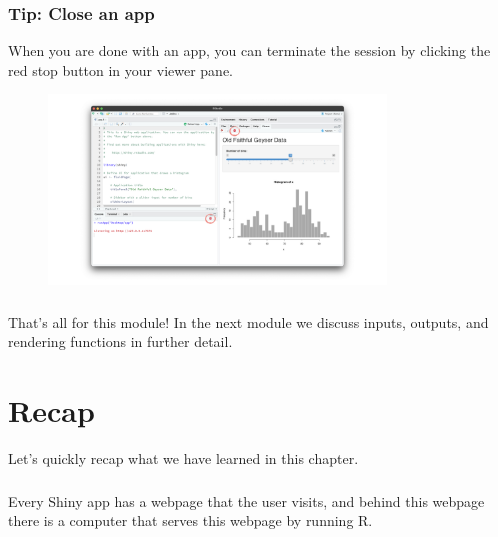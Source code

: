 \documentclass[
  letterpaper,
  DIV=11,
  numbers=noendperiod]{scrreprt}
\begin{document}
\hypertarget{tip-close-an-app-2}{%
\subsection{Tip: Close an app}\label{tip-close-an-app-2}}

When you are done with an app, you can terminate the session by clicking
the red stop button in your viewer pane.

\begin{figure}

{\centering \includegraphics[width=0.8\textwidth,height=\textheight]{./images/recap-6.png}

}

\end{figure}

\hypertarget{section-21}{%
\subsection{}\label{section-21}}

That's all for this module! In the next module we discuss inputs,
outputs, and rendering functions in further detail.

\hypertarget{recap-3}{%
\chapter{Recap}\label{recap-3}}

Let's quickly recap what we have learned in this chapter.

\hypertarget{section-22}{%
\subsection{}\label{section-22}}

Every Shiny app has a webpage that the user visits, and behind this
webpage there is a computer that serves this webpage by running R.
\end{document}
